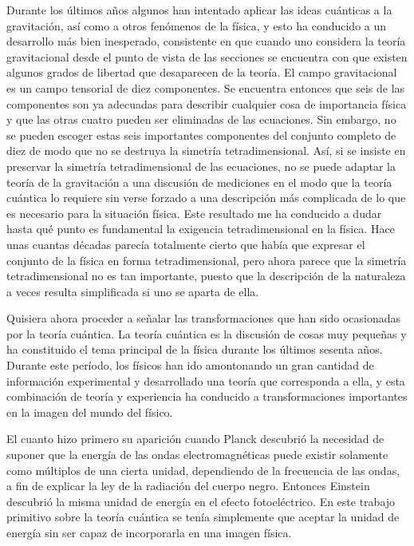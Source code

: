 \documentclass[a4paper, 12pt]{article}
\begin{document}
Durante los últimos años algunos han intentado aplicar las ideas cuánticas a la gravitación, así como a otros fenómenos de la física, y esto ha conducido a un desarrollo más bien inesperado, consistente en que cuando uno considera la teoría gravitacional desde el punto de vista de las secciones se encuentra con que existen algunos grados de libertad que desaparecen de la teoría. El campo gravitacional es un campo tensorial de diez componentes. Se encuentra entonces que seis de las componentes son ya adecuadas para describir cualquier cosa de importancia física y que las otras cuatro pueden ser eliminadas de las ecuaciones. Sin embargo, no se pueden escoger estas seis importantes componentes del conjunto completo de diez de modo que no se destruya la simetría tetradimensional. Así, si se insiste en preservar la simetría tetradimensional de las ecuaciones, no se puede adaptar la teoría de la gravitación a una discusión de mediciones en el modo que la teoría cuántica lo requiere sin verse forzado a una descripción más complicada de lo que es necesario para la situación física. Este resultado me ha conducido a dudar hasta qué punto es fundamental la exigencia tetradimensional en la física. Hace unas cuantas décadas parecía totalmente cierto que había que expresar el conjunto de la física en forma tetradimensional, pero ahora parece que la simetría tetradimensional no es  tan importante, puesto que la descripción de la naturaleza a veces resulta simplificada si uno se aparta de ella.

Quisiera ahora proceder a señalar las transformaciones que han sido ocasionadas por la teoría cuántica. La teoría cuántica es la discusión de cosas muy pequeñas y ha constituido el tema principal de la física durante los últimos sesenta años. Durante este período, los físicos han ido amontonando un gran cantidad de información experimental y desarrollado una teoría que corresponda a ella, y esta combinación de teoría y experiencia ha conducido a transformaciones importantes en la imagen del mundo del físico.

El cuanto hizo primero su aparición cuando Planck descubrió la necesidad de suponer que la energía de las ondas electromagnéticas puede existir solamente como múltiplos de una cierta 
unidad, dependiendo de la frecuencia de las ondas, a fin de explicar la ley de la radiación del cuerpo negro. Entonces Einstein descubrió la misma unidad de energía en el efecto fotoeléctrico. En este trabajo primitivo sobre la teoría cuántica se tenía simplemente que aceptar la unidad de energía sin ser capaz de incorporarla en una imagen física.
\end{document}
